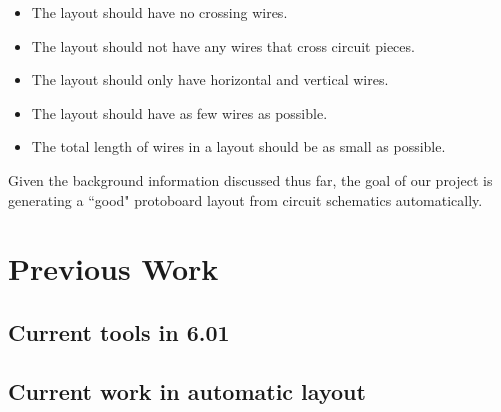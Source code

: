 \begin{itemize}
\item The layout should have no crossing wires.
\item The layout should not have any wires that cross circuit pieces.
\item The layout should only have horizontal and vertical wires.
\item The layout should have as few wires as possible.
\item The total length of wires in a layout should be as small as possible.
\end{itemize}

Given the background information discussed thus far, the goal of our project is
generating a ``good" protoboard layout from circuit schematics automatically.

\section{Previous Work}

\subsection{Current tools in 6.01}

\subsection{Current work in automatic layout}
